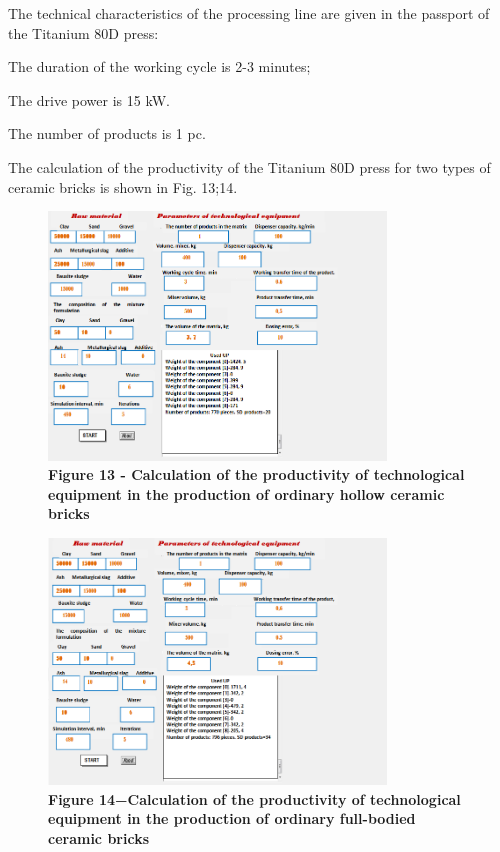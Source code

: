 The technical characteristics of the processing line are given in the
passport of the Titanium 80D press:

The duration of the working cycle is 2-3 minutes;

The drive power is 15 kW.

The number of products is 1 pc.

The calculation of the productivity of the Titanium 80D press for two
types of ceramic bricks is shown in Fig. 13;14.

\begin{figure}[H]
	\centering
	\includegraphics[width=0.8\textwidth]{assets/279}
	\caption*{\bfseries Figure 13 - Calculation of the productivity of technological
	equipment in the production  of ordinary hollow ceramic bricks}
\end{figure}



\begin{figure}[H]
	\centering
	\includegraphics[width=0.8\textwidth]{assets/280}
	\caption*{\bfseries Figure 14−Calculation of the productivity of technological
	equipment in the production of ordinary full-bodied ceramic bricks}
\end{figure}



